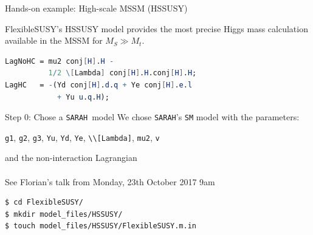 \documentclass[hyperref={pdfpagelabels=false},ngerman]{beamer}
\newcommand{\MS}{\ensuremath{M_S}}
\newcommand{\SARAH}{\texttt{SARAH}}
\begin{document}
\begin{frame}{Hands-on example: High-scale MSSM (HSSUSY)}
  \begin{center}
  \end{center}
  FlexibleSUSY's HSSUSY model provides the most precise Higgs mass
  calculation available in the MSSM for $\MS \gg M_t$.
\end{frame}

\newsavebox{\listbox}
\newsavebox{\listboxt}

\begin{lrbox}{\listbox}\begin{lstlisting}[language=Mathematica]
LagNoHC = mu2 conj[H].H -
          1/2 \[Lambda] conj[H].H.conj[H].H;
LagHC   = -(Yd conj[H].d.q + Ye conj[H].e.l
            + Yu u.q.H);
\end{lstlisting}\end{lrbox}

\begin{frame}{Step 0: Chose a \SARAH\ model}
  We chose \SARAH's \texttt{SM} model with the parameters:
  \begin{center}
  \lstinline{g1}, \lstinline{g2}, \lstinline{g3}, \lstinline{Yu},
  \lstinline{Yd}, \lstinline{Ye}, \lstinline{\\[Lambda]},
  \lstinline{mu2}, \lstinline{v}
  \end{center}
  and the non-interaction Lagrangian \\[2em]
  \usebox{\listbox}
  \\[1em]
  See Florian's talk from Monday, 23th October 2017 9am
\end{frame}

\begin{lrbox}{\listbox}\begin{lstlisting}[language=bash]
$ cd FlexibleSUSY/
$ mkdir model_files/HSSUSY/
$ touch model_files/HSSUSY/FlexibleSUSY.m.in
\end{lstlisting}\end{lrbox} %
\end{document}
